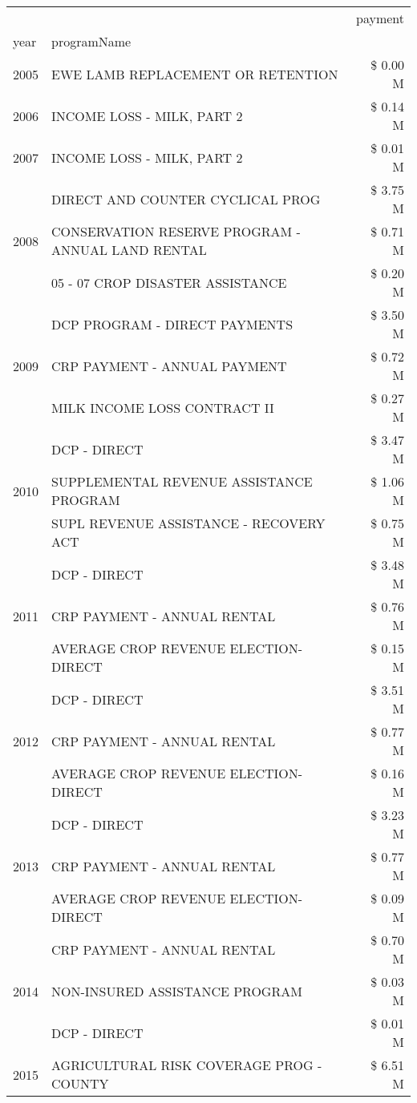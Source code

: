 \begin{tabular}{llr}
\toprule
 &  & payment \\
year & programName &  \\
\midrule
2005 & EWE LAMB REPLACEMENT OR RETENTION & \$ 0.00 M \\
\cline{1-3}
2006 & INCOME LOSS - MILK, PART 2 & \$ 0.14 M \\
\cline{1-3}
2007 & INCOME LOSS - MILK, PART 2 & \$ 0.01 M \\
\cline{1-3}
\multirow[t]{3}{*}{2008} & DIRECT AND COUNTER CYCLICAL PROG & \$ 3.75 M \\
 & CONSERVATION RESERVE PROGRAM - ANNUAL LAND RENTAL & \$ 0.71 M \\
 & 05 - 07 CROP DISASTER ASSISTANCE & \$ 0.20 M \\
\cline{1-3}
\multirow[t]{3}{*}{2009} & DCP PROGRAM - DIRECT PAYMENTS & \$ 3.50 M \\
 & CRP PAYMENT - ANNUAL PAYMENT & \$ 0.72 M \\
 & MILK INCOME LOSS CONTRACT II & \$ 0.27 M \\
\cline{1-3}
\multirow[t]{3}{*}{2010} & DCP - DIRECT & \$ 3.47 M \\
 & SUPPLEMENTAL REVENUE ASSISTANCE PROGRAM & \$ 1.06 M \\
 & SUPL REVENUE ASSISTANCE - RECOVERY ACT & \$ 0.75 M \\
\cline{1-3}
\multirow[t]{3}{*}{2011} & DCP - DIRECT & \$ 3.48 M \\
 & CRP PAYMENT - ANNUAL RENTAL & \$ 0.76 M \\
 & AVERAGE CROP REVENUE ELECTION-DIRECT & \$ 0.15 M \\
\cline{1-3}
\multirow[t]{3}{*}{2012} & DCP - DIRECT & \$ 3.51 M \\
 & CRP PAYMENT - ANNUAL RENTAL & \$ 0.77 M \\
 & AVERAGE CROP REVENUE ELECTION-DIRECT & \$ 0.16 M \\
\cline{1-3}
\multirow[t]{3}{*}{2013} & DCP - DIRECT & \$ 3.23 M \\
 & CRP PAYMENT - ANNUAL RENTAL & \$ 0.77 M \\
 & AVERAGE CROP REVENUE ELECTION-DIRECT & \$ 0.09 M \\
\cline{1-3}
\multirow[t]{3}{*}{2014} & CRP PAYMENT - ANNUAL RENTAL & \$ 0.70 M \\
 & NON-INSURED ASSISTANCE PROGRAM & \$ 0.03 M \\
 & DCP - DIRECT & \$ 0.01 M \\
\cline{1-3}
\multirow[t]{3}{*}{2015} & AGRICULTURAL RISK COVERAGE PROG - COUNTY & \$ 6.51 M \\

\end{tabular}
